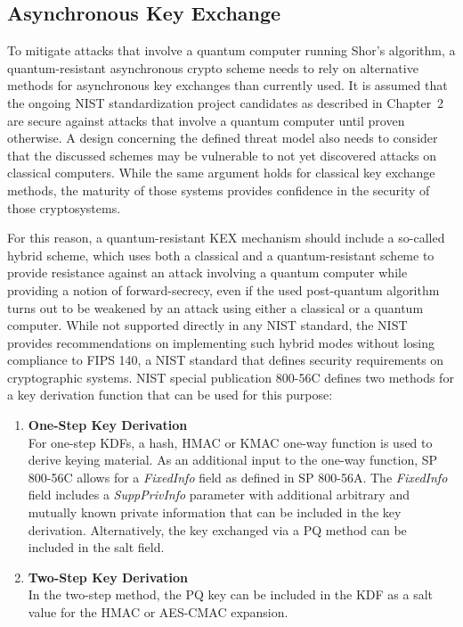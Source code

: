 \subsection{Asynchronous Key Exchange}
To mitigate attacks that involve a quantum computer running Shor's algorithm, a quantum-resistant asynchronous crypto scheme needs to rely on alternative methods for asynchronous key exchanges than currently used. It is assumed that the ongoing \ac{NIST} standardization project candidates as described in Chapter~2 are secure against attacks that involve a quantum computer until proven otherwise. A design concerning the defined threat model also needs to consider that the discussed schemes may be vulnerable to not yet discovered attacks on classical computers. While the same argument holds for classical key exchange methods, the maturity of those systems provides confidence in the security of those cryptosystems.

For this reason, a quantum-resistant KEX mechanism should include a so-called hybrid scheme, which uses both a classical and a quantum-resistant scheme to provide resistance against an attack involving a quantum computer while providing a notion of forward-secrecy, even if the used post-quantum algorithm turns out to be weakened by an attack using either a classical or a quantum computer. While not supported directly in any \ac{NIST} standard, the \ac{NIST} provides recommendations on implementing such hybrid modes without losing compliance to \ac{FIPS} 140, a \ac{NIST} standard that defines security requirements on cryptographic systems. \ac{NIST} special publication 800-56C defines two methods for a key derivation function that can be used for this purpose\cite{barker2018recommendation}:

\begin{enumerate}
    \item \textbf{One-Step Key Derivation}\\
    For one-step \acp{KDF}, a hash, HMAC or KMAC one-way function is used to derive keying material. As an additional input to the one-way function, SP 800-56C allows for a \textit{FixedInfo} field as defined in SP 800-56A. The \textit{FixedInfo} field includes a \textit{SuppPrivInfo} parameter with additional arbitrary and mutually known private information that can be included in the key derivation. Alternatively, the key exchanged via a \ac{PQ} method can be included in the salt field.
    \item \textbf{Two-Step Key Derivation}\\ In the two-step method, the \ac{PQ} key can be included in the \ac{KDF} as a salt value for the HMAC or AES-CMAC expansion.
\end{enumerate}

